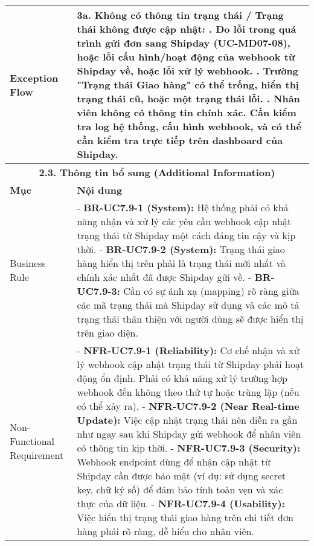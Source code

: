 \begin{longtable}{|m{4cm}|p{11cm}|}
\hline
Exception Flow & \textbf{3a. Không có thông tin trạng thái / Trạng thái không được cập nhật:} \newline    1. Do lỗi trong quá trình gửi đơn sang Shipday (UC-MD07-08), hoặc lỗi cấu hình/hoạt động của webhook từ Shipday về, hoặc lỗi xử lý webhook. \newline    2. Trường "Trạng thái Giao hàng" có thể trống, hiển thị trạng thái cũ, hoặc một trạng thái lỗi. \newline    3. Nhân viên không có thông tin chính xác. Cần kiểm tra log hệ thống, cấu hình webhook, và có thể cần kiểm tra trực tiếp trên dashboard của Shipday. \\
\hline
\multicolumn{2}{|c|}{\textbf{2.3. Thông tin bổ sung (Additional Information)}} \\
\hline
\textbf{Mục} & \textbf{Nội dung} \\
\hline
Business Rule & - \textbf{BR-UC7.9-1 (System):} Hệ thống phải có khả năng nhận và xử lý các yêu cầu webhook cập nhật trạng thái từ Shipday một cách đáng tin cậy và kịp thời. \newline - \textbf{BR-UC7.9-2 (System):} Trạng thái giao hàng hiển thị trên phải là trạng thái mới nhất và chính xác nhất đã được Shipday gửi về. \newline - \textbf{BR-UC7.9-3:} Cần có sự ánh xạ (mapping) rõ ràng giữa các mã trạng thái mà Shipday sử dụng và các mô tả trạng thái thân thiện với người dùng sẽ được hiển thị trên giao diện. \\
\hline
Non-Functional Requirement & - \textbf{NFR-UC7.9-1 (Reliability):} Cơ chế nhận và xử lý webhook cập nhật trạng thái từ Shipday phải hoạt động ổn định. Phải có khả năng xử lý trường hợp webhook đến không theo thứ tự hoặc trùng lặp (nếu có thể xảy ra). \newline - \textbf{NFR-UC7.9-2 (Near Real-time Update):} Việc cập nhật trạng thái nên diễn ra gần như ngay sau khi Shipday gửi webhook để nhân viên có thông tin kịp thời. \newline - \textbf{NFR-UC7.9-3 (Security):} Webhook endpoint dùng để nhận cập nhật từ Shipday cần được bảo mật (ví dụ: sử dụng secret key, chữ ký số) để đảm bảo tính toàn vẹn và xác thực của dữ liệu. \newline - \textbf{NFR-UC7.9-4 (Usability):} Việc hiển thị trạng thái giao hàng trên chi tiết đơn hàng phải rõ ràng, dễ hiểu cho nhân viên. \\
\hline
\end{longtable}

